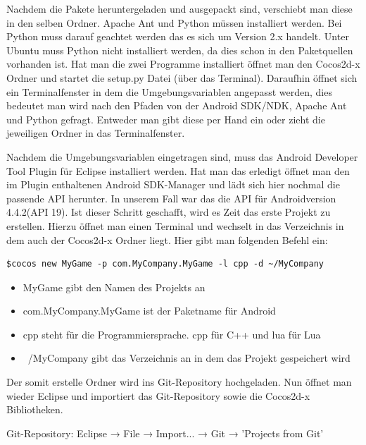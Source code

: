 Nachdem die Pakete heruntergeladen und ausgepackt sind, verschiebt man diese in den selben Ordner. Apache Ant und Python müssen installiert werden. Bei Python muss darauf geachtet werden das es sich um Version 2.x handelt. Unter Ubuntu muss Python nicht installiert werden, da dies schon in den Paketquellen vorhanden ist. 
Hat man die zwei Programme installiert öffnet man den Cocos2d-x Ordner und startet die setup.py Datei (über das Terminal). Daraufhin öffnet sich ein Terminalfenster in dem die Umgebungsvariablen angepasst werden, dies bedeutet man wird nach den Pfaden von der Android SDK/NDK, Apache Ant und Python gefragt. Entweder man gibt diese per Hand ein oder zieht die jeweiligen Ordner in das Terminalfenster. 



\label{sec:2_IDE}

Nachdem die Umgebungsvariablen eingetragen sind, muss das Android Developer Tool Plugin für Eclipse installiert werden. Hat man das erledigt öffnet man den im Plugin enthaltenen Android SDK-Manager und lädt sich hier nochmal die passende API herunter. In unserem Fall war das die API für Androidversion 4.4.2(API 19). 
Ist dieser Schritt geschafft, wird es Zeit das erste Projekt zu erstellen.
Hierzu öffnet man einen Terminal und wechselt in das Verzeichnis in dem auch der Cocos2d-x Ordner liegt. Hier gibt man folgenden Befehl ein:
	
\begin{lstlisting}[style=singleline]
	$cocos new MyGame -p com.MyCompany.MyGame -l cpp -d ~/MyCompany
\end{lstlisting}
		
\begin{itemize}
\item MyGame gibt den Namen des Projekts an
\item com.MyCompany.MyGame ist der Paketname für Android
\item cpp steht für die Programmiersprache. cpp für C++ und lua für Lua
\item ~/MyCompany gibt das Verzeichnis an in dem das Projekt gespeichert wird 
\end{itemize}

Der somit erstelle Ordner wird ins Git-Repository hochgeladen. 
Nun öffnet man wieder Eclipse und importiert das Git-Repository sowie die Cocos2d-x Bibliotheken. 

	Git-Repository: Eclipse → File → Import... → Git → 'Projects from Git'

